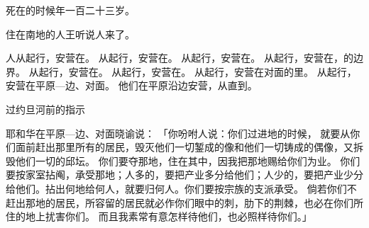 {死在{}的时候年一百二十三岁。
\par }{\PP {}住在{}南地的{}人{}王听说{}人来了。
\par }{\PP {}人从{}起行，安营在{}。
从{}起行，安营在{}。
从{}起行，安营在{}。
从{}起行，安营在{}，{}的边界。
从{}起行，安营在{}。
从{}起行，安营在{}。
从{}起行，安营在{}对面的{}里。
从{}起行，安营在{}平原—{}边、{}对面。
他们在{}平原沿{}边安营，从{}直到{}。
\par }{\SH 过约旦河前的指示
\par }{\PP {}耶和华在{}平原—{}边、{}对面晓谕{}说：
「你吩咐{}人说：你们过{}进{}地的时候，
就要从你们面前赶出那里所有的居民，毁灭他们一切錾成的{}像和他们一切铸成的偶像，又拆毁他们一切的邱坛。
你们要夺那地，住在其中，因我把那地赐给你们为业。
你们要按家室拈阄，承受那地；人多的，要把产业多分给他们；人少的，要把产业少分给他们。拈出何地给何人，就要归何人。你们要按宗族的支派承受。
倘若你们不赶出那地的居民，所容留的居民就必作你们眼中的刺，肋下的荆棘，也必在你们所住的地上扰害你们。
而且我素常有意怎样待他们，也必照样待你们。」

}
